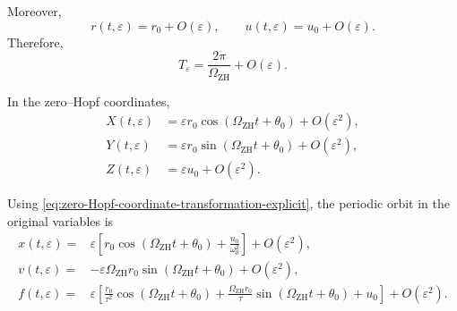 \documentclass[11pt,reqno]{amsart}
\theoremstyle{plain}
\theoremstyle{definition}
\theoremstyle{remark}
\begin{document}
Moreover,
\[
r(t,\varepsilon)=r_0+O(\varepsilon),
\qquad
u(t,\varepsilon)=u_0+O(\varepsilon).
\]
Therefore,
\begin{equation}
\label{eq:zero-Hopf-period}
T_\varepsilon
=
\frac{
2\pi
}{
\Omega_{\mathrm{ZH}}
}
+
O(\varepsilon).
\end{equation}

In the zero--Hopf coordinates,
\begin{equation}
\label{eq:zero-Hopf-XYZ-periodic}
\begin{aligned}
X(t,\varepsilon)
&=
\varepsilon r_0
\cos\left(
\Omega_{\mathrm{ZH}}t+\theta_0
\right)
+
O(\varepsilon^2),
\\[2mm]
Y(t,\varepsilon)
&=
\varepsilon r_0
\sin\left(
\Omega_{\mathrm{ZH}}t+\theta_0
\right)
+
O(\varepsilon^2),
\\[2mm]
Z(t,\varepsilon)
&=
\varepsilon u_0
+
O(\varepsilon^2).
\end{aligned}
\end{equation}

Using
\eqref{eq:zero-Hopf-coordinate-transformation-explicit}, the periodic
orbit in the original variables is
\begin{equation}
\label{eq:zero-Hopf-original-periodic-orbit}
\begin{aligned}
x(t,\varepsilon)
={}&
\varepsilon
\left[
r_0
\cos\left(
\Omega_{\mathrm{ZH}}t+\theta_0
\right)
+
\frac{u_0}{\omega_0^2}
\right]
+
O(\varepsilon^2),
\\[2mm]
v(t,\varepsilon)
={}&
-\varepsilon
\Omega_{\mathrm{ZH}}r_0
\sin\left(
\Omega_{\mathrm{ZH}}t+\theta_0
\right)
+
O(\varepsilon^2),
\\[2mm]
f(t,\varepsilon)
={}&
\varepsilon
\left[
\frac{r_0}{\tau^2}
\cos\left(
\Omega_{\mathrm{ZH}}t+\theta_0
\right)
+
\frac{
\Omega_{\mathrm{ZH}}r_0
}{\tau}
\sin\left(
\Omega_{\mathrm{ZH}}t+\theta_0
\right)
+
u_0
\right]
+
O(\varepsilon^2).
\end{aligned}
\end{equation}
\end{document}
